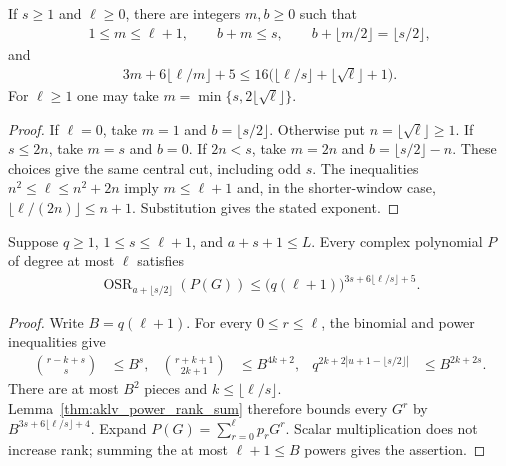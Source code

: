 \begin{lemma}
    \label{thm:aklv_effective_window}
    \leanok
    If $s\ge1$ and $\ell\ge0$, there are integers $m,b\ge0$ such that
    \begin{align*}
        1\le m\le\ell+1,\qquad b+m\le s,\qquad
        b+\lfloor m/2\rfloor=\lfloor s/2\rfloor,
    \end{align*}
    and
    \begin{align*}
        3m+6\lfloor\ell/m\rfloor+5
        \le16\bigl(\lfloor\ell/s\rfloor+\lfloor\sqrt\ell\rfloor+1\bigr).
    \end{align*}
    For $\ell\ge1$ one may take $m=\min\{s,2\lfloor\sqrt\ell\rfloor\}$.
\end{lemma}
\begin{proof}
    \leanok
    If $\ell=0$, take $m=1$ and $b=\lfloor s/2\rfloor$.
    Otherwise put $n=\lfloor\sqrt\ell\rfloor\ge1$.
    If $s\le2n$, take $m=s$ and $b=0$.
    If $2n<s$, take $m=2n$ and $b=\lfloor s/2\rfloor-n$.
    These choices give the same central cut, including odd $s$.
    The inequalities $n^2\le\ell\le n^2+2n$ imply
    $m\le\ell+1$ and, in the shorter-window case,
    $\lfloor\ell/(2n)\rfloor\le n+1$. Substitution gives the stated exponent.
\end{proof}

\begin{lemma}
    \label{thm:aklv_width_polynomial_rank}
    \leanok
    Suppose $q\ge1$, $1\le s\le\ell+1$, and $a+s+1\le L$.
    Every complex polynomial $P$ of degree at most $\ell$ satisfies
    \begin{align*}
        \operatorname{OSR}_{a+\lfloor s/2\rfloor}(P(G))
        \le\bigl(q(\ell+1)\bigr)^{3s+6\lfloor\ell/s\rfloor+5}.
    \end{align*}
\end{lemma}
\begin{proof}
    \leanok
    Write $B=q(\ell+1)$. For every $0\le r\le\ell$, the binomial and power
    inequalities give
    \begin{align*}
        \binom{r-k+s}{s}                 & \le B^s,       &
        \binom{r+k+1}{2k+1}              & \le B^{4k+2},  &
        q^{2k+2|u+1-\lfloor s/2\rfloor|} & \le B^{2k+2s}.
    \end{align*}
    There are at most $B^2$ pieces and $k\le\lfloor\ell/s\rfloor$.
    Lemma~\ref{thm:aklv_power_rank_sum} therefore bounds every $G^r$ by
    $B^{3s+6\lfloor\ell/s\rfloor+4}$. Expand
    $P(G)=\sum_{r=0}^{\ell}p_rG^r$.
    Scalar multiplication does not increase rank; summing the at most
    $\ell+1\le B$ powers gives the assertion.
\end{proof}

